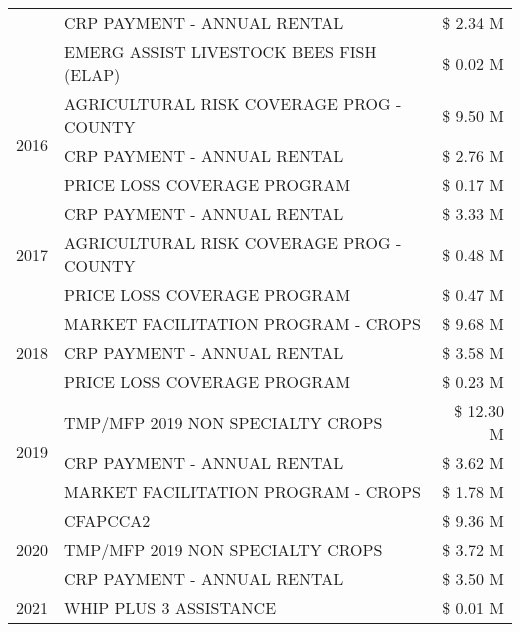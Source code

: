 \begin{tabular}{llr}
 & CRP PAYMENT - ANNUAL RENTAL & \$ 2.34 M \\
 & EMERG ASSIST LIVESTOCK BEES FISH (ELAP) & \$ 0.02 M \\
\cline{1-3}
\multirow[t]{3}{*}{2016} & AGRICULTURAL RISK COVERAGE PROG - COUNTY & \$ 9.50 M \\
 & CRP PAYMENT - ANNUAL RENTAL & \$ 2.76 M \\
 & PRICE LOSS COVERAGE PROGRAM & \$ 0.17 M \\
\cline{1-3}
\multirow[t]{3}{*}{2017} & CRP PAYMENT - ANNUAL RENTAL & \$ 3.33 M \\
 & AGRICULTURAL RISK COVERAGE PROG - COUNTY & \$ 0.48 M \\
 & PRICE LOSS COVERAGE PROGRAM & \$ 0.47 M \\
\cline{1-3}
\multirow[t]{3}{*}{2018} & MARKET FACILITATION PROGRAM - CROPS & \$ 9.68 M \\
 & CRP PAYMENT - ANNUAL RENTAL & \$ 3.58 M \\
 & PRICE LOSS COVERAGE PROGRAM & \$ 0.23 M \\
\cline{1-3}
\multirow[t]{3}{*}{2019} & TMP/MFP 2019 NON SPECIALTY CROPS & \$ 12.30 M \\
 & CRP PAYMENT - ANNUAL RENTAL & \$ 3.62 M \\
 & MARKET FACILITATION PROGRAM - CROPS & \$ 1.78 M \\
\cline{1-3}
\multirow[t]{3}{*}{2020} & CFAPCCA2 & \$ 9.36 M \\
 & TMP/MFP 2019 NON SPECIALTY CROPS & \$ 3.72 M \\
 & CRP PAYMENT - ANNUAL RENTAL & \$ 3.50 M \\
\cline{1-3}
2021 & WHIP PLUS 3 ASSISTANCE & \$ 0.01 M \\
\cline{1-3}
\bottomrule
\end{tabular}
